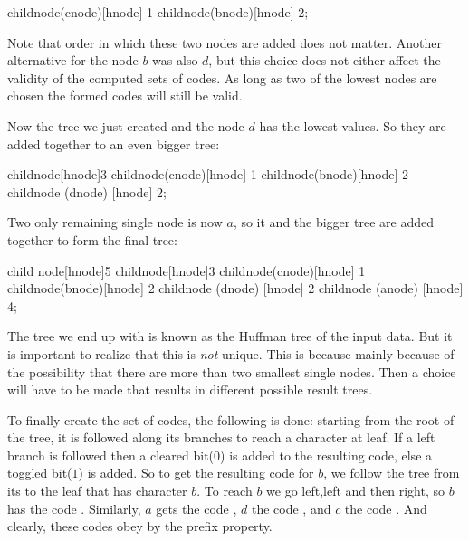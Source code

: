 \begin{huffmanc}
  child{node(cnode)[hnode] {1}}
  child{node(bnode)[hnode] {2}};
\end{huffmanc}

Note that order in which these two nodes are added does not
matter. Another alternative for the node $b$ was also $d$, but this
choice does not either affect the validity of the computed sets of
codes. As long as two of the lowest nodes are chosen the formed codes
will still be valid.

Now the tree we just created and the node $d$ has the lowest
values. So they are added together to an even bigger tree:

\begin{huffmanc}
  child{node[hnode]{3}
  child{node(cnode)[hnode] {1}}
  child{node(bnode)[hnode] {2}}}
  child{node (dnode) [hnode] {2}};


\end{huffmanc}

Two only remaining single node is now $a$, so it and the bigger tree
are added together to form the final tree:

\begin{huffmanc}

  child {node[hnode]{5}
  child{node[hnode]{3}
  child{node(cnode)[hnode] {1}}
  child{node(bnode)[hnode] {2}}}
  child{node (dnode) [hnode] {2}}}
  child{node (anode) [hnode] {4}};


\end{huffmanc}

The tree we end up with is known as the Huffman tree of the input
data. But it is important to realize that this is \textit{not}
unique. This is because mainly because of the possibility that there
are more than two smallest single nodes. Then a choice will have to be
made that results in different possible result trees.

To finally create the set of codes, the following is done: starting
from the root of the tree, it is followed along its branches to reach
a character at leaf. If a left branch is followed then a cleared bit($0$)
is added to the resulting code, else a toggled bit($1$) is added. So
to get the resulting code for $b$, we follow the tree from its to the
leaf that has character $b$. To reach $b$ we go left,left and then
right, so $b$ has the code . Similarly, $a$ gets the code
, $d$ the code , and $c$ the code . And
clearly, these codes obey by the prefix property.


